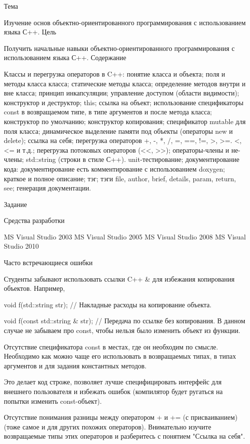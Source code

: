 \documentclass[a4paper,12pt]{article}
\begin{document}
Тема

Изучение основ объектно-ориентированного программирования с использованием языка С++.
Цель

Получить начальные навыки объектно-ориентированного программирования с использованием языка С++.
Содержание

Классы и перегрузка операторов в C++:
понятие класса и объекта;
поля и методы класса класса;
статические методы класса;
определение методов внутри и вне класса;
принцип инкапсуляции;
управление доступом (области видимости);
конструктор и деструктор;
this;
ссылка на объект;
использование спецификаторы const в возвращаемом типе, в типе аргументов и после метода класса;
конструктор по умолчанию;
конструктор копирования;
спецификатор mutable для поля класса;
динамическое выделение памяти под объекты (операторы new и delete);
ссылка на себя;
перегрузка операторов +, -, *, /, =, ==, !=, >, >=. <, <= и т.д.;
перегрузка потоковых операторов (<<, >>);
операторы-члены и не-члены;
std::string (строки в стиле С++). 
unit-тестирование;
документирование кода:
документирование есть комментирование с использованием doxygen;
краткое и полное описание;
тэг;
тэги file, author, brief, details, param, return, see;
генерация документации. 

Задание


Средства разработки

MS Visual Studio 2003
MS Visual Studio 2005
MS Visual Studio 2008
MS Visual Studio 2010 

Часто встречающиеся ошибки

Студенты забывают использовать ссылки C++ & для избежания копирования объектов. Например, 

void f(std::string str); // Накладные расходы на копирование объекта.

void f(const std::string & str); // Передача по ссылке без копирования. В данном случае не забываем про const, чтобы нельзя было изменить объект из функции.



Отсутствие спецификатора const в местах, где он необходим по смысле. Необходимо как можно чаще его использовать в возвращаемых типах, в типах аргументов и для задания константных методов. 

Это делает код строже, позволяет лучше специфицировать интерфейс для внешнего пользователя и избежать ошибок (компилятор будет ругаться на попытки изменить const-объект).

Отсутствие понимания разницы между оператором + и += (с присваиванием) (тоже самое и для других похожих операторов). Внимательно изучите возвращаемые типы этих операторов и разберитесь с понятием "Ссылка на себя". 
\end{document}

